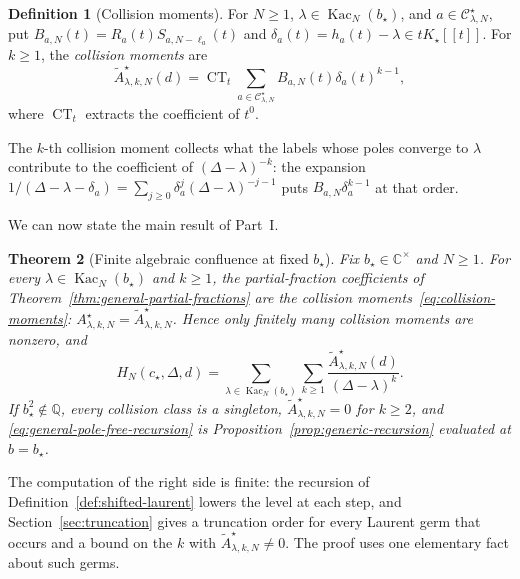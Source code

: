 \documentclass[twoside,10pt]{article}
\numberwithin{equation}{section}
\theoremstyle{slbody}
\newtheorem{theorem}{Theorem}[section]
\theoremstyle{definition}
\newtheorem{definition}[theorem]{Definition}
\theoremstyle{remark}
\newcommand{\CT}{\operatorname{CT}}
\begin{document}
\begin{definition}[Collision moments]\label{def:collision-moments}
For \(N\geq1\), \(\lambda\in\operatorname{Kac}_N(b_\star)\), and
\(a\in{\mathcal C}^{\star}_{\lambda,N}\), put
\(B_{a,N}(t)=R_a(t)S_{a,N-\ell_a}(t)\) and
\(\delta_a(t)=h_a(t)-\lambda\in tK_\star[[t]]\).  For \(k\geq1\), the
\emph{collision moments} are
\begin{equation}\label{eq:collision-moments}
 \widetilde A^{\star}_{\lambda,k,N}(d)
 =\CT_{t}
 \sum_{a\in{\mathcal C}^{\star}_{\lambda,N}}
 B_{a,N}(t)\delta_a(t)^{k-1},
\end{equation}
where \(\CT_t\) extracts the coefficient of \(t^0\).
\end{definition}

The \(k\)-th collision moment collects what the labels whose poles converge
to \(\lambda\) contribute to the coefficient of \((\Delta-\lambda)^{-k}\): the
expansion \(1/(\Delta-\lambda-\delta_a)=\sum_{j\geq0}\delta_a^j(\Delta-\lambda)^{-j-1}\)
puts \(B_{a,N}\delta_a^{k-1}\) at that order.

We can now state the main result of Part~I.

\begin{theorem}[Finite algebraic confluence at fixed \(b_\star\)]
\label{thm:general-confluence}
Fix \(b_\star\in\mathbb C^\times\) and \(N\geq1\).  For every
\(\lambda\in\operatorname{Kac}_N(b_\star)\) and \(k\geq1\), the
partial-fraction coefficients of Theorem~\ref{thm:general-partial-fractions}
are the collision moments~\eqref{eq:collision-moments}:
\(A^{\star}_{\lambda,k,N}=\widetilde A^{\star}_{\lambda,k,N}\).  Hence only
finitely many collision moments are nonzero, and
\begin{equation}\label{eq:general-pole-free-recursion}
 H_N(c_\star,\Delta,d)
 =\sum_{\lambda\in\operatorname{Kac}_N(b_\star)}
   \sum_{k\geq1}
   \frac{\widetilde A^{\star}_{\lambda,k,N}(d)}{(\Delta-\lambda)^k}.
\end{equation}
If \(b_\star^2\notin\mathbb Q\), every collision class is a singleton,
\(\widetilde A^{\star}_{\lambda,k,N}=0\) for \(k\geq2\), and
\eqref{eq:general-pole-free-recursion} is
Proposition~\ref{prop:generic-recursion} evaluated at \(b=b_\star\).
\end{theorem}

The computation of the right side is finite: the recursion of
Definition~\ref{def:shifted-laurent} lowers the level at each step, and
Section~\ref{sec:truncation} gives a truncation order for every Laurent germ
that occurs and a bound on the \(k\) with
\(\widetilde A^\star_{\lambda,k,N}\neq0\).  The proof uses one elementary fact about such
germs.
\end{document}
